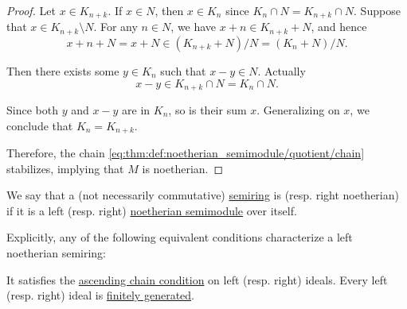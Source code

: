 \begin{proof}
  Let \( x \in K_{n + k} \). If \( x \in N \), then \( x \in K_n \) since \( K_n \cap N = K_{n + k} \cap N \). Suppose that \( x \in K_{n + k} \setminus N \). For any \( n \in N \), we have \( x + n \in K_{n + k} + N \), and hence
  \begin{equation*}
    x + n + N = x + N \in (K_{n + k} + N) / N = (K_n + N) / N.
  \end{equation*}

  Then there exists some \( y \in K_n \) such that \( x - y \in N \). Actually
  \begin{equation*}
    x - y \in K_{n + k} \cap N = K_n \cap N.
  \end{equation*}

  Since both \( y \) and \( x - y \) are in \( K_n \), so is their sum \( x \). Generalizing on \( x \), we conclude that \( K_n = K_{n + k} \).

  Therefore, the chain \eqref{eq:thm:def:noetherian_semimodule/quotient/chain} stabilizes, implying that \( M \) is noetherian.
\end{proof}

\begin{definition}\label{def:noetherian_semiring}
  We say that a (not necessarily commutative) \hyperref[def:semiring]{semiring} is  (resp. right noetherian) if it is a left (resp. right) \hyperref[def:noetherian_semimodule]{noetherian semimodule} over itself.

  Explicitly, any of the following equivalent conditions characterize a left noetherian semiring:
  \begin{thmenum}
     It satisfies the \hyperref[def:chain_condition]{ascending chain condition} on left (resp. right) ideals.
     Every left (resp. right) ideal is \hyperref[def:semiring_ideal/generated]{finitely generated}.
  \end{thmenum}
\end{definition}

